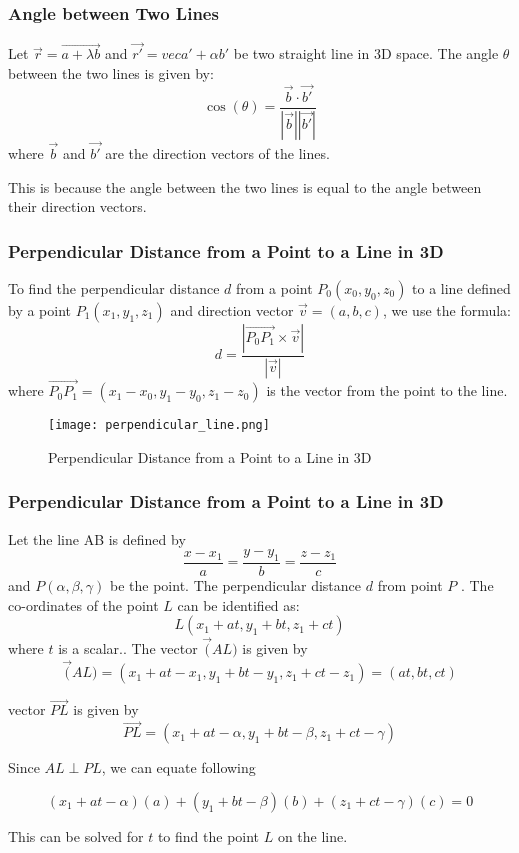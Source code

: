 \begin{frame}
    \frametitle{Angle between Two Lines}
    Let \(\vec{r} = \vec{a+ \lambda b}\) and \(\vec{r'} = vec{a'} + \alpha b'\) be two straight line in 3D space. The angle \(\theta\) between the two lines is given by:
    \[
    \cos(\theta) = \frac{\vec{b} \cdot \vec{b'}}{|\vec{b}| |\vec{b'}|}
    \]
    where \(\vec{b}\) and \(\vec{b'}\) are the direction vectors of the lines.

    This is because the angle between the two lines is equal to the angle between their direction vectors.
\end{frame}

\begin{frame}
    \frametitle{Perpendicular Distance from a Point to a Line in 3D}
    To find the perpendicular distance \(d\) from a point \(P_0(x_0, y_0, z_0)\) to a line defined by a point \(P_1(x_1, y_1, z_1)\) and direction vector \(\vec{v} = (a, b, c)\), we use the formula:
    \[
    d = \frac{|\vec{P_0P_1} \times \vec{v}|}{|\vec{v}|}
    \]
    where \(\vec{P_0P_1} = (x_1 - x_0, y_1 - y_0, z_1 - z_0)\) is the vector from the point to the line.        
\end{frame}


\begin{frame}
\begin{figure}
    \texttt{[image: perpendicular\_line.png]}
    \caption{Perpendicular Distance from a Point to a Line in 3D}
\end{figure}
\end{frame}
\begin{frame}
    \frametitle{Perpendicular Distance from a Point to a Line in 3D}
    Let the line AB is defined by 
    \[\frac{x-x_{1}}{a} = \frac{y-y_{1}}{b} = \frac{z-z_{1}}{c}\]
    and \(P(\alpha, \beta, \gamma)\) be the point. The perpendicular distance \(d\) from point \(P\) . The co-ordinates of the point \(L\) can be identified as:
    \[L(x_{1}+at, y_{1}+bt, z_{1}+ct)\]  
    where \(t\) is a scalar.. The vector \(\vec(AL)\) is given by 
    \[\vec(AL) = (x_{1}+at - x_{1}, y_{1}+bt - y_{1}, z_{1}+ct - z_{1}) = (at, bt, ct)\] 
\end{frame} 

\begin{frame}
    
    vector \(\vec{PL} \) is given by 
    \[\vec{PL} = (x_{1}+at - \alpha, y_{1}+bt - \beta, z_{1}+ct - \gamma)\]  
    
    Since \(AL \perp PL\), we can equate following

    \[(x_{1}+at-\alpha)(a) + (y_{1}+bt-\beta)(b) + (z_{1}+ct-\gamma)(c) = 0\]

    This can be solved for \(t\) to find the point \(L\) on the line.

\end{frame}

